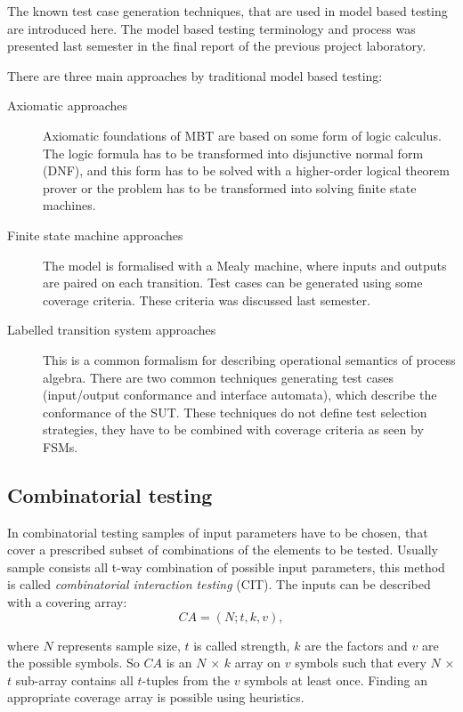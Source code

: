 \documentclass{article}
\begin{document}
The known test case generation techniques, that are used in model based testing are introduced here. The model based testing terminology and process was presented last semester in the final report of the previous project laboratory.

There are three main approaches by traditional model based testing:

\begin{description}
	\item[Axiomatic approaches] Axiomatic foundations of MBT are based on some form of logic calculus. The logic formula has to be transformed into disjunctive normal form (DNF), and this form has to be solved with a higher-order logical theorem prover or the problem has to be transformed into solving finite state machines.
	\item[Finite state machine approaches] The model is formalised with a Mealy machine, where inputs and outputs are paired on each transition. Test cases can be generated using some coverage criteria. These criteria was discussed last semester.
	\item[Labelled transition system approaches] This is a common formalism for describing operational semantics of process algebra. There are two common techniques generating test cases (input/output conformance and interface automata), which describe the conformance of the SUT. These techniques do not define test selection strategies, they have to be combined with coverage criteria as seen by FSMs.
\end{description}


\subsection{Combinatorial testing}
\label{sub:combinatorialtesting}

In combinatorial testing samples of input parameters have to be chosen, that cover a prescribed subset of combinations of the elements to be tested. Usually sample consists all t-way combination of possible input parameters, this method is called \textit{combinatorial interaction testing} (CIT). The inputs can be described with a covering array:
\begin{displaymath}
CA=(N;t, k, v),
\end{displaymath}

where $N$ represents sample size, $t$ is called strength, $k$ are the factors and $v$ are the possible symbols. So $CA$ is an $N$ × $k$ array on $v$ symbols such that every $N$ × $t$ sub-array contains all $t$-tuples from the $v$ symbols at least once. Finding an appropriate coverage array is possible using heuristics.
\end{document}
